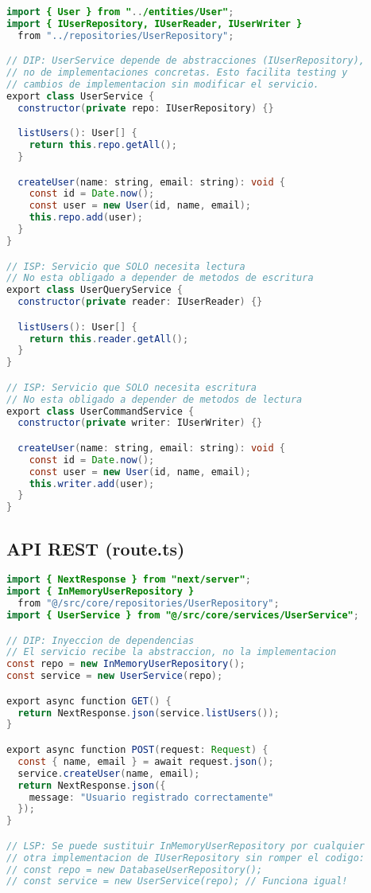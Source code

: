 \documentclass[11pt,a4paper]{article}
\begin{document}
\begin{lstlisting}[language=Java]
import { User } from "../entities/User";
import { IUserRepository, IUserReader, IUserWriter }
  from "../repositories/UserRepository";

// DIP: UserService depende de abstracciones (IUserRepository),
// no de implementaciones concretas. Esto facilita testing y
// cambios de implementacion sin modificar el servicio.
export class UserService {
  constructor(private repo: IUserRepository) {}

  listUsers(): User[] {
    return this.repo.getAll();
  }

  createUser(name: string, email: string): void {
    const id = Date.now();
    const user = new User(id, name, email);
    this.repo.add(user);
  }
}

// ISP: Servicio que SOLO necesita lectura
// No esta obligado a depender de metodos de escritura
export class UserQueryService {
  constructor(private reader: IUserReader) {}

  listUsers(): User[] {
    return this.reader.getAll();
  }
}

// ISP: Servicio que SOLO necesita escritura
// No esta obligado a depender de metodos de lectura
export class UserCommandService {
  constructor(private writer: IUserWriter) {}

  createUser(name: string, email: string): void {
    const id = Date.now();
    const user = new User(id, name, email);
    this.writer.add(user);
  }
}
\end{lstlisting}

\subsection*{API REST (route.ts)}

\begin{lstlisting}[language=Java]
import { NextResponse } from "next/server";
import { InMemoryUserRepository }
  from "@/src/core/repositories/UserRepository";
import { UserService } from "@/src/core/services/UserService";

// DIP: Inyeccion de dependencias
// El servicio recibe la abstraccion, no la implementacion
const repo = new InMemoryUserRepository();
const service = new UserService(repo);

export async function GET() {
  return NextResponse.json(service.listUsers());
}

export async function POST(request: Request) {
  const { name, email } = await request.json();
  service.createUser(name, email);
  return NextResponse.json({
    message: "Usuario registrado correctamente"
  });
}

// LSP: Se puede sustituir InMemoryUserRepository por cualquier
// otra implementacion de IUserRepository sin romper el codigo:
// const repo = new DatabaseUserRepository();
// const service = new UserService(repo); // Funciona igual!
\end{lstlisting}
\end{document}
